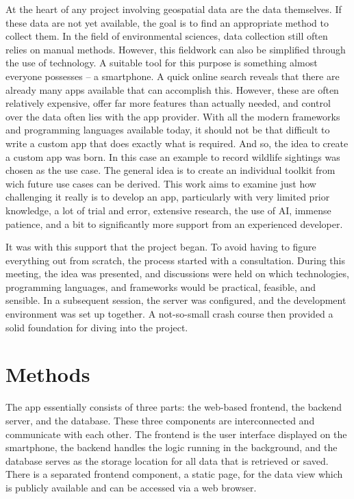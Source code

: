 \documentclass{josis}
\begin{document}
At the heart of any project involving geospatial data are the data themselves. If these data are not yet available, 
the goal is to find an appropriate method to collect them. In the field of environmental sciences, 
data collection still often relies on manual methods. However, this fieldwork can also be simplified through the use of technology. 
A suitable tool for this purpose is something almost everyone possesses -- a smartphone.
A quick online search reveals that there are already many apps available that can accomplish this. 
However, these are often relatively expensive, offer far more features than actually needed, 
and control over the data often lies with the app provider. With all the modern frameworks 
and programming languages available today, it should not be that difficult to write a 
custom app that does exactly what is required.
And so, the idea to create a custom app was born.
In this case an example to record wildlife sightings was chosen as the use case.
The general idea is to create an individual toolkit from wich future use cases can be derived. 
This work aims to examine just how challenging it really is to develop an app, 
particularly with very limited prior knowledge, a lot of trial and error, 
extensive research, the use of AI, immense patience, 
and a bit to significantly more support from an experienced developer.

It was with this support that the project began. To avoid having to figure everything out from scratch, 
the process started with a consultation. During this meeting, the idea was presented, 
and discussions were held on which technologies, programming languages, 
and frameworks would be practical, feasible, and sensible. 
In a subsequent session, the server was configured, and the development environment was set up together. 
A not-so-small crash course then provided a solid foundation for diving into the project.

\section{Methods}

The app essentially consists of three parts: the web-based frontend, the backend server, 
and the database. These three components are interconnected and communicate with each other. 
The frontend is the user interface displayed on the smartphone, 
the backend handles the logic running in the background, 
and the database serves as the storage location for all data that is retrieved or saved.
There is a separated frontend component, a static page,
for the data view which is publicly available and can be accessed via a web browser.
\end{document}
